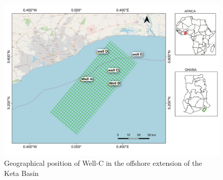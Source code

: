 \documentclass{gji}
\begin{document}
\begin{figure}%
    \centering
    \includegraphics[width=\textwidth]{studyarea} %
    \caption{Geographical position of Well-C in the offshore extension of the Keta Basin}
    \label{fig:study_area}
\end{figure}
\end{document}
